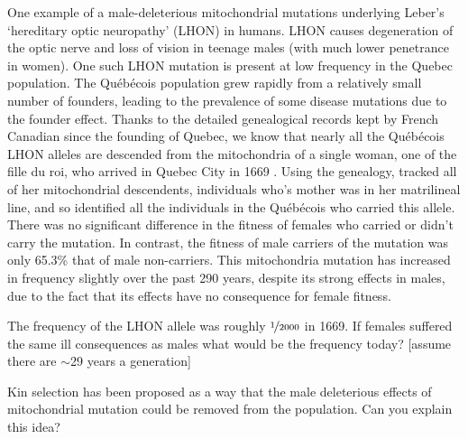 {One example of a male-deleterious mitochondrial mutations underlying
Leber’s `hereditary optic neuropathy' (LHON) in humans. LHON causes degeneration
of the optic nerve and loss of vision in teenage males (with much
lower penetrance in women). One such LHON mutation is present at low
frequency in the Quebec population. The  Qu{\'e}b{\'e}cois population grew
rapidly from a relatively small number of founders, leading to the
prevalence of some disease mutations due to the founder effect. Thanks to the detailed
genealogical records kept by French Canadian since the founding of
Quebec, we know that nearly all the Qu{\'e}b{\'e}cois LHON alleles are
descended from the mitochondria of a single woman, one of the fille du roi, who arrived in Quebec City
in 1669 \citep{laberge2005fille}.  Using the genealogy, \citet{milot2017mother} tracked all
of her mitochondrial descendents, individuals who's mother was in her
matrilineal line, and so identified all the individuals in the
Qu{\'e}b{\'e}cois who carried this allele.
There was no significant difference in the fitness of females who
carried or didn't carry the mutation. In contrast, the fitness of male carriers of the mutation was only 65.3\% that of male non-carriers. 
This mitochondria mutation has increased in frequency slightly over the past 290
years, despite its strong effects in males, due to the fact that its effects have no consequence for female fitness.

\begin{question}
The frequency of the LHON allele was roughly $\nicefrac{1}{2000}$ in
1669. If females suffered the same ill consequences as males what
would be the frequency today? [assume there are $\sim$29 years a generation]
\end{question}

\begin{question}
Kin selection has been proposed as a way that the male deleterious
effects of mitochondrial mutation could be removed from the
population. Can you explain this idea?
\end{question}  

}
